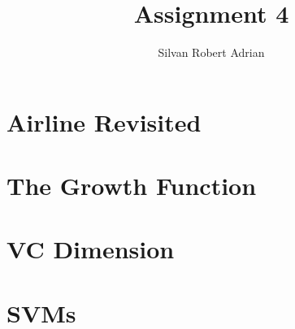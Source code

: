 \documentclass[a4paper]{article}
\title{\vspace{-5cm} Assignment 4}
\author{Silvan Robert Adrian}
\begin{document}
\maketitle

\tableofcontents

\section{Airline Revisited}

\section{The Growth Function}


\section{VC Dimension}


\section{SVMs}

\end{document}

